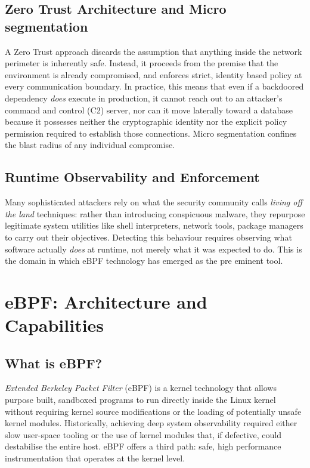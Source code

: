\subsection{Zero Trust Architecture and Micro segmentation}
 
A Zero Trust approach discards the assumption that anything inside the network perimeter is inherently safe. Instead, it proceeds from the premise that the environment is already compromised, and enforces strict, identity based policy at every communication boundary. In practice, this means that even if a backdoored dependency \textit{does} execute in production, it cannot reach out to an attacker's command and control (C2) server, nor can it move laterally toward a database because it possesses neither the cryptographic identity nor the explicit policy permission required to establish those connections. Micro segmentation confines the blast radius of any individual compromise.
 
\subsection{Runtime Observability and Enforcement}
 
Many sophisticated attackers rely on what the security community calls \textit{living off the land} techniques: rather than introducing conspicuous malware, they repurpose legitimate system utilities like shell interpreters, network tools, package managers to carry out their objectives. Detecting this behaviour requires observing what software actually \textit{does} at runtime, not merely what it was expected to do. This is the domain in which eBPF technology has emerged as the pre eminent tool.
 
\section{eBPF: Architecture and Capabilities}
 
\subsection{What is eBPF?}
 
\textit{Extended Berkeley Packet Filter} (eBPF) is a kernel technology that allows purpose built, sandboxed programs to run directly inside the Linux kernel without requiring kernel source modifications or the loading of potentially unsafe kernel modules. Historically, achieving deep system observability required either slow user-space tooling or the use of kernel modules that, if defective, could destabilise the entire host. eBPF offers a third path: safe, high performance instrumentation that operates at the kernel level.
 
